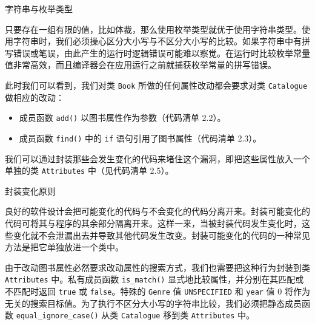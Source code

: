\begin{mySidebar}{字符串与枚举类型}

只要存在一组有限的值，比如体裁，那么使用枚举类型就优于使用字符串类型。使用字符串时，我们必须操心区分大小写与不区分大小写的比较。如果字符串中有拼写错误或笔误，由此产生的运行时逻辑错误可能难以察觉。在运行时比较枚举常量值非常高效，而且编译器会在应用运行之前就捕获枚举常量的拼写错误。
\end{mySidebar}

此时我们可以看到，我们对类 \texttt{Book} 所做的任何属性改动都会要求对类 \texttt{Catalogue} 做相应的改动：

\begin{itemize}
\item 成员函数 \texttt{add()} 以图书属性作为参数（代码清单 2.2）。
\item 成员函数 \texttt{find()} 中的 \texttt{if} 语句引用了图书属性（代码清单 2.3）。
\end{itemize}


我们可以通过封装那些会发生变化的代码来堵住这个漏洞，即把这些属性放入一个单独的类 \texttt{Attributes} 中（见代码清单 2.5）。

\begin{mySidebar}{封装变化原则}

良好的软件设计会把可能变化的代码与不会变化的代码分离开来。封装可能变化的代码可将其与程序的其余部分隔离开来。这样一来，当被封装代码发生变化时，这些变化就不会泄漏出去并导致其他代码发生改变。封装可能变化的代码的一种常见方法是把它单独放进一个类中。
\end{mySidebar}

由于改动图书属性必然要求改动属性的搜索方式，我们也需要把这种行为封装到类 \texttt{Attributes} 中。私有成员函数 \texttt{is\_\allowbreak{}match(\allowbreak{})\allowbreak{}} 显式地比较属性，并分别在其匹配或不匹配时返回 \texttt{true} 或 \texttt{false}。特殊的 \texttt{Genre} 值 \texttt{UNSPECIFIED} 和 \texttt{year} 值 0 将作为无关的搜索目标值。为了执行不区分大小写的字符串比较，我们必须把静态成员函数 \texttt{equal\_\allowbreak{}ignore\_\allowbreak{}case(\allowbreak{})\allowbreak{}} 从类 \texttt{Catalogue} 移到类 \texttt{Attributes} 中。


